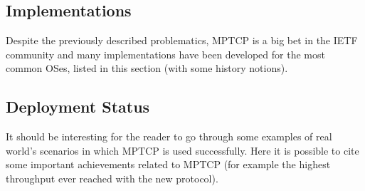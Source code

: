 \subsection{Implementations}
Despite the previously described problematics, MPTCP is a big bet in the IETF community and many implementations have been developed for the most common OSes, listed in this section (with some history notions).

\subsection{Deployment Status}
It should be interesting for the reader to go through some examples of real world's scenarios in which MPTCP is used successfully. Here it is possible to cite some important achievements related to MPTCP (for example the highest throughput ever reached with the new protocol).
